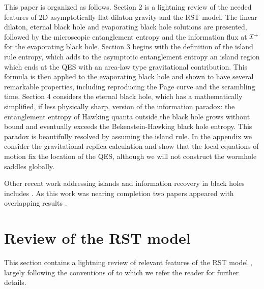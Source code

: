 \documentclass[11pt,oneside,letterpaper]{article}
\numberwithin{equation}{section}
\begin{document}
This paper is organized as follows. Section 2 is a lightning review of the needed features of 2D asymptotically flat dilaton gravity and the RST model.  The linear dilaton, eternal black hole and evaporating black hole solutions are presented, followed by  the microscopic entanglement entropy and the information flux at
${\cal I}^+$ for the evaporating black hole. Section 3 begins with the definition of the island rule entropy, which  adds to the asymptotic entanglement entropy an island region which ends at the QES with an area-law type gravitational contribution. This formula is then applied to the evaporating black hole and shown to have several remarkable properties, including reproducing the Page curve and the scrambling time.  Section 4 considers the 
eternal black hole, which has a mathematically simplified, if less physically sharp, version of the information paradox: the entanglement entropy of Hawking quanta outside the black hole grows without bound and eventually exceeds the Bekenstein-Hawking black hole entropy. This paradox is beautifully resolved by assuming the island rule.  In the appendix we consider the gravitational replica calculation and show that the local equations of motion fix the location of the QES, although we will not construct the wormhole saddles globally.




 Other recent work addressing islands and information recovery in black holes includes \cite{Zhao:2019nxk, Akers:2019nfi, Rozali:2019day, Chen:2019uhq, Bousso:2019ykv, Almheiri:2019psy, Chen:2019iro, Laddha:2020kvp, Mousatov:2020ics, Kim:2020cds, Saraswat:2020zzf, Chen:2020wiq, Marolf:2020xie, Verlinde:2020upt, Jana:2020vyx, Giddings:2020yes, Liu:2020gnp, Pollack:2020gfa, Balasubramanian:2020hfs}. As this work was nearing completion two  papers appeared with overlapping results \cite{Gautason:2020tmk,Anegawa:2020ezn}.



\section{Review of the RST model}


This section contains a lightning review of relevant features of the RST model \cite{Russo:1992ax}, largely following the conventions of \cite{Fiola:1994ir}
to which we refer the reader for further details. 
\end{document}
